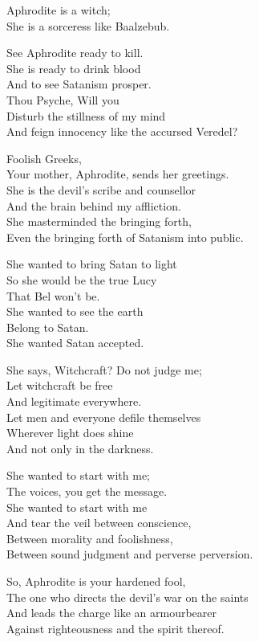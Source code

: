 \documentclass[
]{book}
\begin{document}
Aphrodite is a witch;\\
She is a sorceress like Baalzebub.

See Aphrodite ready to kill.\\
She is ready to drink blood\\
And to see Satanism prosper.\\
Thou Psyche, Will you\\
Disturb the stillness of my mind\\
And feign innocency like the accursed Veredel?

Foolish Greeks,\\
Your mother, Aphrodite, sends her greetings.\\
She is the devil's scribe and counsellor\\
And the brain behind my affliction.\\
She masterminded the bringing forth,\\
Even the bringing forth of Satanism into public.

She wanted to bring Satan to light\\
So she would be the true Lucy\\
That Bel won't be.\\
She wanted to see the earth\\
Belong to Satan.\\
She wanted Satan accepted.

She says, Witchcraft? Do not judge me;\\
Let witchcraft be free\\
And legitimate everywhere.\\
Let men and everyone defile themselves\\
Wherever light does shine\\
And not only in the darkness.

She wanted to start with me;\\
The voices, you get the message.\\
She wanted to start with me\\
And tear the veil between conscience,\\
Between morality and foolishness,\\
Between sound judgment and perverse perversion.

So, Aphrodite is your hardened fool,\\
The one who directs the devil's war on the saints\\
And leads the charge like an armourbearer\\
Against righteousness and the spirit thereof.
\end{document}
